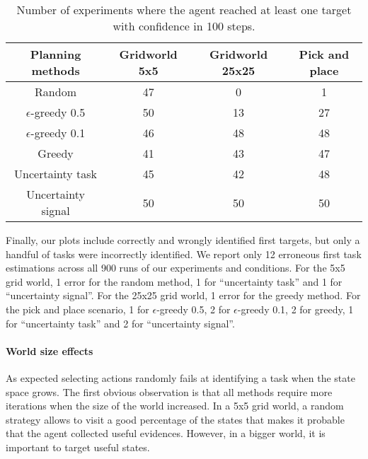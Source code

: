 \begin{table}[!htbp]
\centering
{}
\begin{tabular}{c c c c}
    Planning methods & Gridworld 5x5 & Gridworld 25x25 &  Pick and place \\ \hline
    Random & 47 & 0 & 1 \\ 
    $\epsilon$-greedy 0.5 & 50 & 13 & 27 \\
    $\epsilon$-greedy 0.1 & 46 & 48 & 48 \\
    Greedy & 41 & 43 & 47 \\
    Uncertainty task & 45 & 42 & 48 \\
    Uncertainty signal & 50 & 50 & 50 \\
\end{tabular}
\caption{Number of experiments where the agent reached at least one target with confidence in 100 steps.}
\label{tab:wordlpropertiesnreach}
\end{table}

Finally, our plots include correctly and wrongly identified first targets, but only a handful of tasks were incorrectly identified. We report only 12 erroneous first task estimations across all 900 runs of our experiments and conditions. For the 5x5 grid world, 1 error for the random method, 1 for ``uncertainty task'' and 1 for ``uncertainty signal''. For the 25x25 grid world, 1 error for the greedy method. For the pick and place scenario, 1 for $\epsilon$-greedy 0.5, 2 for $\epsilon$-greedy 0.1, 2 for greedy, 1 for ``uncertainty task'' and 2 for ``uncertainty signal''.

\paragraph{World size effects}

As expected selecting actions randomly fails at identifying a task when the state space grows. The first obvious observation is that all methods require more iterations when the size of the world increased. In a 5x5 grid world, a random strategy allows to visit a good percentage of the states that makes it probable that the agent collected useful evidences. However, in a bigger world, it is important to target useful states.


